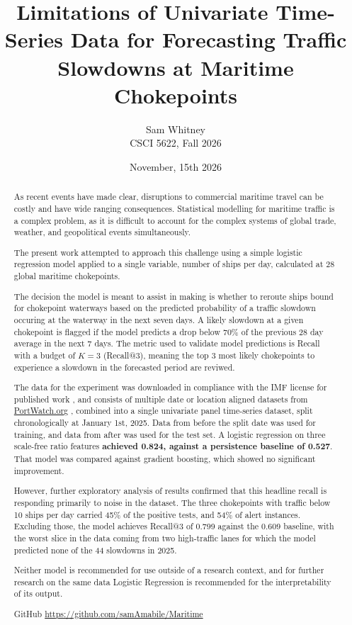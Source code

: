 \documentclass[11pt]{article}
\title{{Limitations of Univariate Time-Series Data for Forecasting Traffic Slowdowns at Maritime Chokepoints}}
\author{{Sam Whitney} \\ CSCI 5622, Fall 2026}
\date{November, 15th 2026}
\begin{document}
\maketitle

\begin{abstract}

    As recent events have made clear, disruptions to commercial maritime travel can be costly and have wide ranging consequences. Statistical modelling for maritime traffic is a complex problem, as it is difficult to account for the complex systems of global trade, weather, and geopolitical events simultaneously. 
    
    The present work attempted to approach this challenge using a simple logistic regression model applied to a single variable, number of ships per day, calculated at 28 global maritime chokepoints. 

    The decision the model is meant to assist in making is whether to reroute ships bound for chokepoint waterways based on the predicted probability of a traffic slowdown occuring at the waterway in the next seven days. A likely slowdown at a given chokepoint is flagged  if the model predicts a drop below 70\% of the previous 28 day average in the next 7 days.  The metric used to validate model predictions is Recall with a budget of $K=3$ (Recall@3), meaning the top 3 most likely chokepoints to experience a slowdown in the forecasted period are reviwed. 

    The data for the experiment was downloaded in compliance with the IMF license for published work \cite{imfterms}, and consists of multiple date or location aligned datasets from \url{PortWatch.org} \cite{portwatch}, combined into a single univariate panel time-series dataset, split chronologically at January 1st, 2025. Data from before the split date was used for training, and data from after was used for the test set. A logistic regression on three scale-free ratio features \textbf{achieved 0.824, against a persistence baseline of 0.527}. That model was compared against gradient boosting, which showed no significant improvement. 

    However, further exploratory analysis of results confirmed that this headline recall is responding primarily to noise in the dataset. The three chokepoints with traffic below 10 ships per day carried 45\% of the positive tests, and 54\% of alert instances. Excluding those, the model achieves Recall@3 of 0.799 against the 0.609 baseline, with the worst slice in the data coming from two high-traffic lanes for which the model predicted none of the 44 slowdowns in 2025. 

    Neither model is recommended for use outside of a research context, and for further research on the same data Logistic Regression is recommended for the interpretability of its output. 

    GitHub \url{https://github.com/samAmabile/Maritime}


    
\end{abstract}
\end{document}
